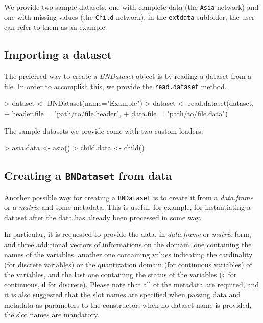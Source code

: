 \documentclass{article}
\newcommand{\Robject}[1]{{\texttt{#1}}}
\newcommand{\Rmethod}[1]{{\texttt{#1}}}
\newcommand{\Rclass}[1]{{\textit{#1}}}
\begin{document}
We provide two sample datasets, one with complete data (the \texttt{Asia} network) and one with missing values
(the \texttt{Child} network), in the \texttt{extdata} subfolder;
the user can refer to them as an example.

\subsection{Importing a dataset}
The preferred way to create a \Rclass{BNDataset} object is by reading a dataset from a file.
In order to accomplish this, we provide the \Rmethod{read.dataset} method.

\begin{Schunk}
\begin{Sinput}
> dataset <- BNDataset(name="Example")
> dataset <- read.dataset(dataset,
+                         header.file = "path/to/file.header",
+                         data.file   = "path/to/file.data")
\end{Sinput}
\end{Schunk}

The sample datasets we provide come with two custom loaders:
\begin{Schunk}
\begin{Sinput}
> asia.data  <- asia()
> child.data <- child()
\end{Sinput}
\end{Schunk}

\subsection{Creating a \Robject{BNDataset} from data}
Another possible way for creating a \Robject{BNDataset} is to create it from a \Rclass{data.frame} or a \Rclass{matrix}
and some metadata. This is useful, for example, for instantiating a dataset after the data has already been 
processed in some way.

In particular, it is requested to provide the data, in \Rclass{data.frame} or \Rclass{matrix} form, and three additional
vectors of informations on the domain: one containing the names of the variables, another one containing values indicating
the cardinality (for discrete variables) or the quantization domain (for continuous variables) of the variables,
and the last one containing the status of the variables (\texttt{c} for continuous, \texttt{d} for discrete). Please note that
all of the metadata are required, and it is also suggested that the slot names are specified when passing data and metadata
as parameters to the constructor; when no dataset name is provided, the slot names are mandatory.
\end{document}
